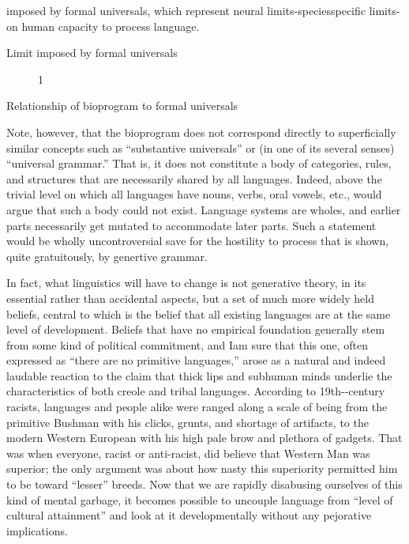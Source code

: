 
imposed by formal universals, which represent neural limits-species\-specific limits-on human capacity to process language.

Limit imposed by formal universals

  


 

\begin{figure}
\caption{1}
\label{fig:5}
\end{figure}

Relationship of bioprogram to formal universals

Note, however, that the bioprogram does not correspond directly to superficially similar concepts such as ``substantive universals'' or (in one of its several senses) ``universal grammar.'' That is, it does not constitute a body of categories, rules, and structures that are necessarily shared by all languages. Indeed, above the trivial level on which all languages have nouns, verbs, oral vowels, etc., would argue that such a body could not exist. Language systems are wholes, and earlier parts necessarily get mutated to accommodate later parts. Such a statement would be wholly uncontroversial save for the hostility to process that is shown, quite gratuitously, by genertive grammar.


In fact, what linguistics will have to change is not generative theory, in its essential rather than accidental aspects, but a set of much more widely held beliefs, central to which is the belief that all existing languages are at the same level of development. Beliefs that have no empirical foundation generally stem from some kind of politi\-cal commitment, and Iam sure that this one, often expressed as ``there are no primitive languages,'' arose as a natural and indeed laudable reaction to the claim that thick lips and subhuman minds underlie the characteristics of both creole and tribal languages. According to 19th-{}-century racists, languages and people alike were ranged along a scale of being from the primitive Bushman with his clicks, grunts, and shortage of artifacts, to the modern Western European with his high pale brow and plethora of gadgets. That was when everyone, racist or anti-racist, did believe that Western Man was superior; the only argument was about how nasty this superiority permitted him to be toward ``lesser'' breeds. Now that we are rapidly disabusing our\-selves of this kind of mental garbage, it becomes possible to uncouple language from ``level of cultural attainment'' and look at it develop\-mentally without any pejorative implications.

